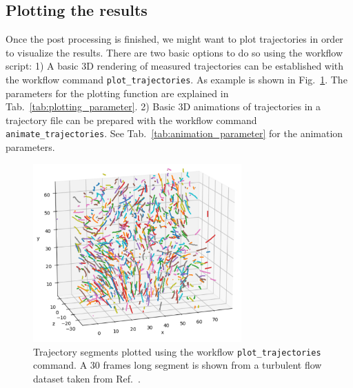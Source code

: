\documentclass[10pt,a4paper]{article}
\begin{document}
\subsection{Plotting the results} \label{sec:plot_trajectories}

Once the post processing is finished, we might want to plot trajectories in order to visualize the results. There are two basic options to do so using the workflow script: 1) A basic 3D rendering of measured trajectories can be established with the workflow command \texttt{plot\_trajectories}. As example is shown in Fig.~\ref{fig:trajectory_plot}. The parameters for the plotting function are explained in Tab.~\ref{tab:plotting_parameter}. 2) Basic 3D animations of trajectories in a trajectory file can be prepared with the workflow command \texttt{animate\_trajectories}. See Tab.~\ref{tab:animation_parameter} for the animation parameters.



\begin{figure}
	\centering
	\includegraphics[width=8cm]{trajectory_plot.pdf}
	\caption{Trajectory segments plotted using the workflow \texttt{plot\_trajectories} command. A 30 frames long segment is shown from a turbulent flow dataset taken from Ref.~\cite{Shnapp2023}. \label{fig:trajectory_plot}}
\end{figure}
\end{document}

